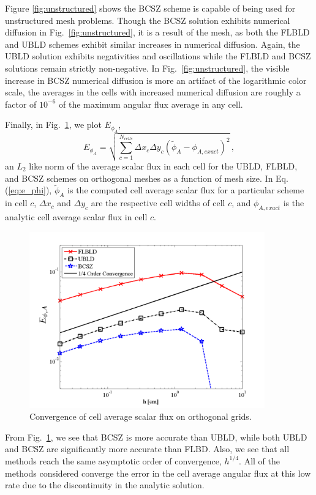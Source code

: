 \documentclass{mc2015}
\newcommand{\fig}[1]{Fig.~\ref{#1}}                      %
\newcommand{\benum}{\begin{equation}} 			%
\newcommand{\eenum}{\end{equation}}
\newcommand{\eqt}[1]{Eq. (\ref{#1})}  %
\newcommand{\pec}{\, ,}
\begin{document}
Figure \ref{fig:unstructured} shows the BCSZ scheme is capable of being used for unstructured mesh problems.
Though the BCSZ solution exhibits numerical diffusion in \fig{fig:unstructured}, it is a result of the mesh, as both the FLBLD and UBLD schemes exhibit similar increases in numerical diffusion.  Again, the UBLD solution exhibits negativities and oscillations while the FLBLD and BCSZ solutions remain strictly non-negative.  In \fig{fig:unstructured}, the visible increase in BCSZ numerical diffusion is more an artifact of the logarithmic color scale, the averages in the cells with increased numerical diffusion are roughly a factor of $10^{-6}$ of the maximum angular flux average in any cell. 

Finally, in \fig{fig:convergence}, we plot $E_{\phi_A}$,
\benum
\label{eq:e_phi}
E_{\phi_A} = \sqrt{ \sum_{c=1}^{N_{cells}}{ \Delta x_c \Delta y_c (\widetilde{\phi}_A - \phi_{A,exact} )^2} } \pec
\eenum
an $L_2$ like norm of the average scalar flux in each cell for the UBLD, FLBLD, and BCSZ schemes on orthogonal meshes as a function of mesh size.  
In \eqt{eq:e_phi}, $\widetilde{\phi}_A$ is the computed cell average scalar flux for a particular scheme in cell $c$, $\Delta x_c$ and $\Delta y_c$ are the respective cell widths of cell $c$, and $\phi_{A,exact}$ is the analytic cell average scalar flux in cell $c$.
\begin{figure}[h]
\centering
\includegraphics[width=4in]{glance_convergence}
\caption{Convergence of cell average scalar flux on orthogonal grids.}
\label{fig:convergence}
\end{figure}
From \fig{fig:convergence}, we see that BCSZ is more accurate than UBLD, while both UBLD and BCSZ are significantly more accurate than FLBD.
Also, we see that all methods reach the same asymptotic order of convergence, $h^{1/4}$.
All of the methods considered converge the error in the cell average angular flux at this low rate due to the discontinuity in the analytic solution.
\end{document}
